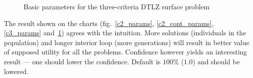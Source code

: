 \begin{figure}
  \hspace{-2.5cm}
  \caption{Basic parameters for the three-criteria DTLZ surface problem}
  \label{c3_surface_params}
\end{figure}

The result shown on the charts (fig.~\ref{c2_params}, \ref{c2_cont_params},
\ref{c3_params} and~\ref{c3_surface_params}) agrees with the intuition. More
solutions (individuals in the population) and longer interior loop (more
generations) will result in better value of supposed utility for all the
problems. Confidence however yields an interesting result --- one should lower
the confidence. Default is $100\%$ ($1.0$)  and should be lowered.

